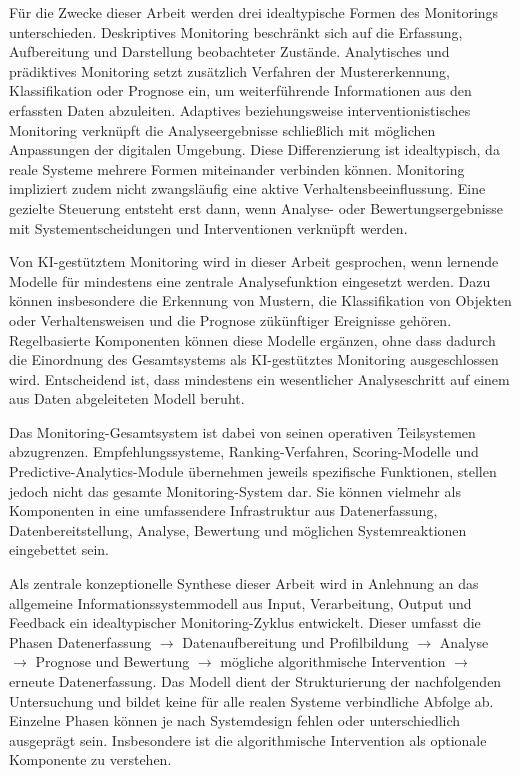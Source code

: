 Für die Zwecke dieser Arbeit werden drei idealtypische Formen des Monitorings unterschieden. Deskriptives Monitoring beschränkt sich auf die Erfassung, Aufbereitung und Darstellung beobachteter Zustände. Analytisches und prädiktives Monitoring setzt zusätzlich Verfahren der Mustererkennung, Klassifikation oder Prognose ein, um weiterführende Informationen aus den erfassten Daten abzuleiten. Adaptives beziehungsweise interventionistisches Monitoring verknüpft die Analyseergebnisse schließlich mit möglichen Anpassungen der digitalen Umgebung. Diese Differenzierung ist idealtypisch, da reale Systeme mehrere Formen miteinander verbinden können. Monitoring impliziert zudem nicht zwangsläufig eine aktive Verhaltensbeeinflussung. Eine gezielte Steuerung entsteht erst dann, wenn Analyse- oder Bewertungsergebnisse mit Systementscheidungen und Interventionen verknüpft werden.

Von KI-gestütztem Monitoring wird in dieser Arbeit gesprochen, wenn lernende Modelle für mindestens eine zentrale Analysefunktion eingesetzt werden. Dazu können insbesondere die Erkennung von Mustern, die Klassifikation von Objekten oder Verhaltensweisen und die Prognose zükünftiger Ereignisse gehören. Regelbasierte Komponenten können diese Modelle ergänzen, ohne dass dadurch die Einordnung des Gesamtsystems als KI-gestütztes Monitoring ausgeschlossen wird. Entscheidend ist, dass mindestens ein wesentlicher Analyseschritt auf einem aus Daten abgeleiteten Modell beruht.

Das Monitoring-Gesamtsystem ist dabei von seinen operativen Teilsystemen abzugrenzen. Empfehlungssysteme, Ranking-Verfahren, Scoring-Modelle und Predictive-Analytics-Module übernehmen jeweils spezifische Funktionen, stellen jedoch nicht das gesamte Monitoring-System dar. Sie können vielmehr als Komponenten in eine umfassendere Infrastruktur aus Datenerfassung, Datenbereitstellung, Analyse, Bewertung und möglichen Systemreaktionen eingebettet sein.

Als zentrale konzeptionelle Synthese dieser Arbeit wird in Anlehnung an das allgemeine Informationssystemmodell aus Input, Verarbeitung, Output und Feedback ein idealtypischer Monitoring-Zyklus entwickelt. Dieser umfasst die Phasen Datenerfassung $\rightarrow$ Datenaufbereitung und Profilbildung $\rightarrow$ Analyse $\rightarrow$ Prognose und Bewertung $\rightarrow$ mögliche algorithmische Intervention $\rightarrow$ erneute Datenerfassung. Das Modell dient der Strukturierung der nachfolgenden Untersuchung und bildet keine für alle realen Systeme verbindliche Abfolge ab. Einzelne Phasen können je nach Systemdesign fehlen oder unterschiedlich ausgeprägt sein. Insbesondere ist die algorithmische Intervention als optionale Komponente zu verstehen.


